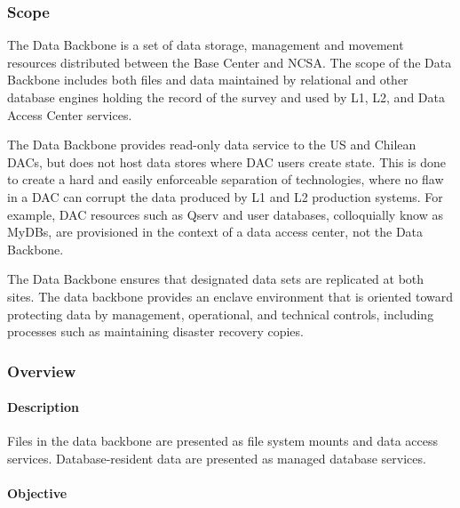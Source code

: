 \subsubsection{Scope}

The Data Backbone is a set of data storage, management and movement
resources distributed between the Base Center and NCSA. The
scope of the Data Backbone includes both files and data maintained by relational
and other database engines holding the record of the survey and used by
L1, L2, and Data Access Center services.

The Data Backbone provides read-only data service to the US and Chilean
DACs, but does not host data stores where DAC users create state. This is
done to create a hard and easily enforceable separation of technologies,
where no flaw in a DAC can corrupt the data produced by L1 and L2
production systems. For example, DAC resources such as Qserv and user databases,
colloquially know as MyDBs, are provisioned in the context of a data
access center, not the Data Backbone.

The Data Backbone ensures that designated data sets are replicated at both sites.
The data backbone provides an enclave environment that is oriented toward
protecting data by management, operational, and technical controls,
including processes such as maintaining disaster recovery copies.

\subsubsection{Overview}

\paragraph{Description}

Files in the data backbone are presented as file system mounts and data access
services. Database-resident data are presented as managed database services.

\paragraph{Objective}

